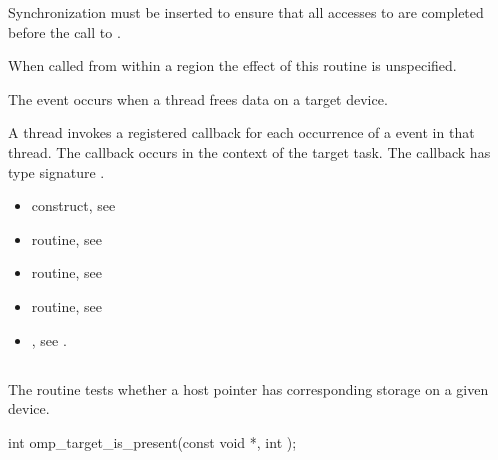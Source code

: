 \begin{ccppspecific}
Synchronization must be inserted to ensure that all accesses to
 are completed before the call to .

When called from within a  region the effect of this routine
is unspecified.

\events
The  event occurs when a thread frees data on a target device.

\tools

A thread invokes a registered 
callback for each occurrence of a  event in that thread.
The callback occurs in the context of the target task.  The callback has type signature
.


\crossreferences
\begin{itemize}
\item {} construct, see

\item {} routine, see

\item {} routine, see

\item {} routine, see

\item {}, see
.

\end{itemize}



\subsection{}
\label{subsec:omp_target_is_present}
\summary

The  routine tests whether a host pointer
has corresponding storage on a given device.

\format
\begin{ompcFunction}
int omp_target_is_present(const void *, int );
\end{ompcFunction}

\constraints


\end{ccppspecific}
